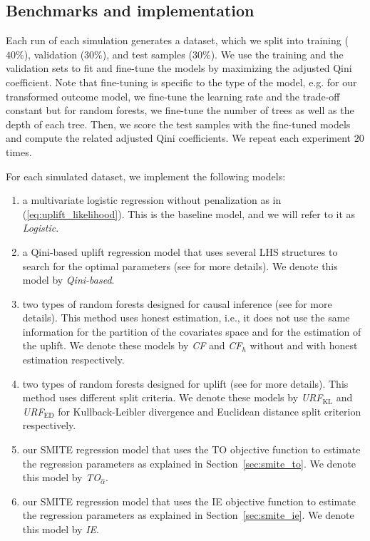 \documentclass{article}
\begin{document}
\subsection{Benchmarks and implementation}

Each run of each simulation generates a dataset, which we split into training ($40\%$), validation ($30\%$), and test samples ($30\%$). We use the training and the validation sets to fit and fine-tune the models by maximizing the adjusted Qini coefficient. Note that fine-tuning is specific to the type of the model, e.g. for our transformed outcome model, we fine-tune the learning rate and the trade-off constant but for random forests, we fine-tune the number of trees as well as the depth of each tree. Then, we score the test samples with the fine-tuned models and compute the related adjusted Qini coefficients. We repeat each experiment $20$ times.

For each simulated dataset, we implement the following models:
\begin{enumerate}
    \item[(a)] a multivariate logistic regression without penalization as in (\ref{eq:uplift_likelihood}). This is the baseline model, and we will refer to it as \textit{Logistic}.
    \item[(b)] a Qini-based uplift regression model that uses several LHS structures to search for the optimal parameters (see \citep{belba2019qbased} for more details). We denote this model by \textit{Qini-based}.
    \item[(c)] two types of random forests designed for causal inference (see \citep{athey2019generalized} for more details). This method uses honest estimation, i.e., it does not use the same information for the partition of the covariates space and for the estimation of the uplift. We denote these models by \textit{CF} and \textit{CF$_h$} without and with honest estimation respectively.
    \item[(d)] two types of random forests designed for uplift (see \citep{jaskowski2012uplift} for more details). This method uses different split criteria. We denote these models by \textit{ URF$_{\mathrm{KL}}$} and \textit{ URF$_{\mathrm{ED}}$} for Kullback-Leibler divergence and Euclidean distance split criterion respectively.
    \item[(e)] our SMITE regression model that uses the TO objective function to estimate the regression parameters as explained in Section~\ref{sec:smite_to}. We denote this model by \textit{TO$_{\hat{\alpha}}$}.
    \item[(f)] our SMITE regression model that uses the IE objective function to estimate the regression parameters as explained in Section~\ref{sec:smite_ie}. We denote this model by \textit{IE}.
\end{enumerate}
\end{document}
